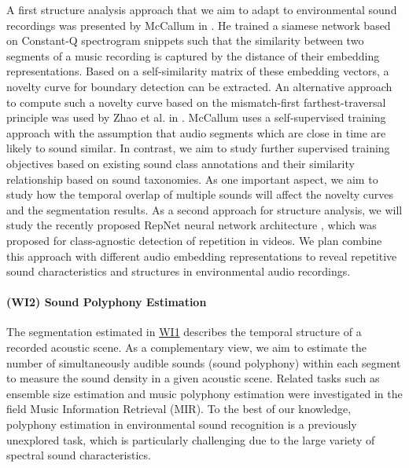 \documentclass[11pt]{article}
\newcommand{\wpdef}[2]{\hypertarget{sec:W#1}{\paragraph*{(W#1) #2}\label{sec:W#1}}}
\newcommand{\wpref}[2]{\hyperlink{sec:W#1}{#2}}
\begin{document}
A first structure analysis approach that we aim to adapt to environmental sound recordings was presented by McCallum in \cite{McCallum:2019:Segmentation:ICASSP}. He trained a siamese network based on Constant-Q spectrogram snippets such that the similarity between two segments of a music recording is captured by the distance of their embedding representations.
Based on a self-similarity matrix of these embedding vectors, a novelty curve for boundary detection can be extracted.
An alternative approach to compute such a novelty curve based on the mismatch-first farthest-traversal principle was used by Zhao et al. in \cite{Zhao:2020:ActiveLearningSED:ARXIV}.
McCallum uses a self-supervised training approach with the assumption that audio segments which are close in time are likely to sound similar.
In contrast, we aim to study further supervised training objectives based on existing sound class annotations and their similarity relationship based on sound taxonomies.
As one important aspect, we aim to study how the temporal overlap of multiple sounds will affect the novelty curves and the segmentation results.
As a second approach for structure analysis, we will study the recently proposed RepNet neural network architecture \cite{Dwibedi:2020:RepNet:CVPR}, which was proposed for class-agnostic detection of repetition in videos. We plan combine this approach with different audio embedding representations to reveal repetitive sound characteristics and structures in environmental audio recordings.
% 


\wpdef{I2}{Sound Polyphony Estimation}
The segmentation estimated in \wpref{I1}{WI1} describes the temporal structure of a recorded acoustic scene.
As a complementary view, we aim to estimate the number of simultaneously audible sounds (sound polyphony) within each segment to measure the sound density in a given acoustic scene. 
Related tasks such as ensemble size estimation \cite{Grollmisch:2019:EnsembleSize:CMMR}
and music polyphony estimation \cite{Kareer2018} were investigated in the field Music Information Retrieval (MIR).
To the best of our knowledge, polyphony estimation in environmental sound recognition is a previously unexplored task, which is particularly challenging due to the large variety of spectral sound characteristics.
\end{document}

